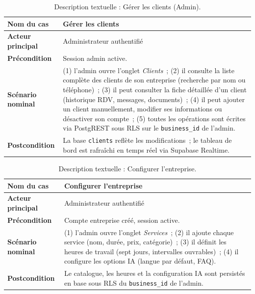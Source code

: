 \begin{table}[H]
  \centering\small
  \caption{Description textuelle : Gérer les clients (Admin).}
  \label{tab:uc-s1-clients}
  \renewcommand{\arraystretch}{1.45}
  \begin{tabular}{|p{3.0cm}|>{\raggedright\arraybackslash}p{10.8cm}|}
    \hline\hline
    \textbf{Nom du cas} & Gérer les clients \\
    \hline
    \textbf{Acteur principal} & Administrateur authentifié \\
    \hline
    \textbf{Précondition} & Session admin active. \\
    \hline
    \textbf{Scénario nominal} &
      (1) l'admin ouvre l'onglet \emph{Clients}~;
      (2) il consulte la liste complète des clients de son entreprise
          (recherche par nom ou téléphone)~;
      (3) il peut consulter la fiche détaillée d'un client
          (historique RDV, messages, documents)~;
      (4) il peut ajouter un client manuellement, modifier ses
          informations ou désactiver son compte~;
      (5) toutes les opérations sont écrites via PostgREST sous RLS
          sur le \texttt{business\_id} de l'admin. \\
          \hline
    \textbf{Postcondition} & La base \texttt{clients} reflète les
      modifications~; le tableau de bord est rafraîchi en temps réel
      via Supabase Realtime. \\
    \hline\hline
  \end{tabular}
\end{table}

\begin{table}[H]
  \centering\small
  \caption{Description textuelle : Configurer l'entreprise.}
  \label{tab:uc-s1-config}
  \renewcommand{\arraystretch}{1.45}
  \begin{tabular}{|p{3.0cm}|>{\raggedright\arraybackslash}p{10.8cm}|}
    \hline\hline
    \textbf{Nom du cas} & Configurer l'entreprise \\
    \hline
    \textbf{Acteur principal} & Administrateur authentifié \\
    \hline
    \textbf{Précondition} & Compte entreprise créé, session active. \\
    \hline
    \textbf{Scénario nominal} &
      (1) l'admin ouvre l'onglet \emph{Services}~;
      (2) il ajoute chaque service (nom, durée, prix, catégorie)~;
      (3) il définit les heures de travail (sept jours, intervalles ouvrables)~;
      (4) il configure les options IA (langue par défaut, FAQ). \\
      \hline
    \textbf{Postcondition} & Le catalogue, les heures et la
      configuration IA sont persistés en base sous RLS du
      \texttt{business\_id} de l'admin. \\
    \hline\hline
  \end{tabular}
\end{table}

